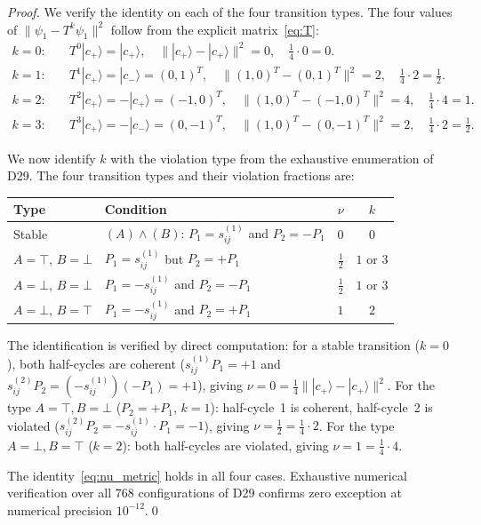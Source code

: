\documentclass[12pt,a4paper]{article}
\newcommand{\cplu}{|c_+\rangle}
\newcommand{\cmin}{|c_-\rangle}
\begin{document}
\begin{proof}
We verify the identity on each of the four transition types. The four values of $\|\psi_1 - T^k\psi_1\|^2$ follow from the explicit matrix~\eqref{eq:T}:
\begin{align*}
k=0:& \quad T^0\cplu = \cplu, \quad \|\cplu - \cplu\|^2 = 0, \quad \tfrac{1}{4}\cdot 0 = 0. \\
k=1:& \quad T^1\cplu = \cmin = (0,1)^T, \quad \|(1,0)^T - (0,1)^T\|^2 = 2, \quad \tfrac{1}{4}\cdot 2 = \tfrac{1}{2}. \\
k=2:& \quad T^2\cplu = -\cplu = (-1,0)^T, \quad \|(1,0)^T - (-1,0)^T\|^2 = 4, \quad \tfrac{1}{4}\cdot 4 = 1. \\
k=3:& \quad T^3\cplu = -\cmin = (0,-1)^T, \quad \|(1,0)^T - (0,-1)^T\|^2 = 2, \quad \tfrac{1}{4}\cdot 2 = \tfrac{1}{2}.
\end{align*}

We now identify $k$ with the violation type from the exhaustive enumeration of D29. The four transition types and their violation fractions are:
\begin{center}
\begin{tabular}{llcc}
\toprule
Type & Condition & $\nu$ & $k$ \\
\midrule
Stable & $(A)\wedge(B)$: $P_1 = s^{(1)}_{ij}$ and $P_2 = -P_1$ & $0$ & $0$ \\
$A=\top,\,B=\bot$ & $P_1 = s^{(1)}_{ij}$ but $P_2 = +P_1$ & $\frac{1}{2}$ & $1$ or $3$ \\
$A=\bot,\,B=\bot$ & $P_1 = -s^{(1)}_{ij}$ and $P_2 = -P_1$ & $\frac{1}{2}$ & $1$ or $3$ \\
$A=\bot,\,B=\top$ & $P_1 = -s^{(1)}_{ij}$ and $P_2 = +P_1$ & $1$ & $2$ \\
\bottomrule
\end{tabular}
\end{center}

The identification is verified by direct computation: for a stable transition ($k=0$), both half-cycles are coherent ($s^{(1)}_{ij} P_1 = +1$ and $s^{(2)}_{ij} P_2 = (-s^{(1)}_{ij})(-P_1) = +1$), giving $\nu = 0 = \tfrac{1}{4}\|\cplu - \cplu\|^2$. For the type $A=\top, B=\bot$ ($P_2 = +P_1$, $k=1$): half-cycle~1 is coherent, half-cycle~2 is violated ($s^{(2)}_{ij}P_2 = -s^{(1)}_{ij}\cdot P_1 = -1$), giving $\nu = \tfrac{1}{2} = \tfrac{1}{4}\cdot 2$. For the type $A=\bot, B=\top$ ($k=2$): both half-cycles are violated, giving $\nu = 1 = \tfrac{1}{4}\cdot 4$.

The identity~\eqref{eq:nu_metric} holds in all four cases. Exhaustive numerical verification over all 768 configurations of D29 confirms zero exception at numerical precision $10^{-12}$.\qed
\end{proof}
\end{document}
